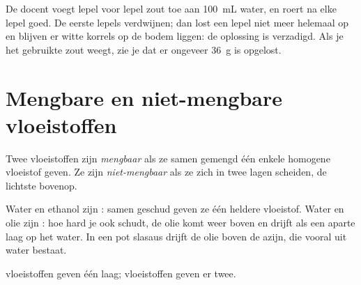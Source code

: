 \begin{inthelab}
De docent voegt lepel voor lepel zout toe aan \qty{100}{mL} water, en
roert na elke lepel goed. De eerste lepels verdwijnen; dan lost een lepel
niet meer helemaal op en blijven er witte korrels op de bodem liggen: de
oplossing is verzadigd. Als je het gebruikte zout weegt, zie je dat er
ongeveer \qty{36}{g} is opgelost.
\end{inthelab}

\section{Mengbare en niet-mengbare vloeistoffen}

\begin{definition}\label{def:g6:solutions-and-solubility:miscible}
Twee vloeistoffen zijn \emph{mengbaar} als ze samen
gemengd één enkele homogene vloeistof geven. Ze zijn
\emph{niet-mengbaar} als ze zich in twee lagen
scheiden, de lichtste bovenop.
\end{definition}

\begin{example}\label{ex:g6:solutions-and-solubility:liquids}
Water en ethanol zijn : samen geschud geven ze één heldere
vloeistof. Water en olie zijn : hoe hard je ook schudt, de
olie komt weer boven en drijft als een aparte laag op het water. In een
pot slasaus drijft de olie boven de azijn, die vooral uit water bestaat.
\end{example}

\begin{omfigure}

{\small {} vloeistoffen geven één laag;  vloeistoffen
geven er twee.}
\end{omfigure}

